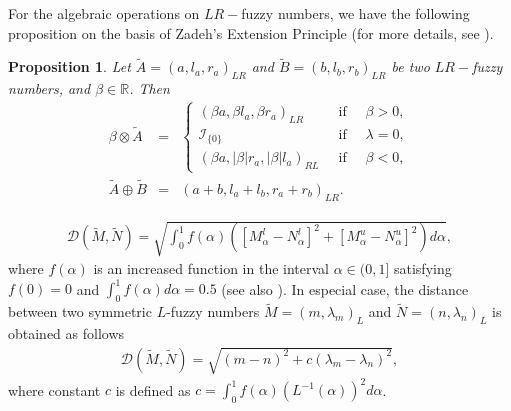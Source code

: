 \documentclass{IJFS}
\newtheorem{proposition}[theorem]{Proposition}
\begin{document}
For the algebraic operations on $LR-$fuzzy numbers, we have the following proposition on the basis of Zadeh's Extension Principle (for more details, see \cite{Kli02}).\\
\begin{proposition}
Let $\widetilde{A} = (a, l_a, r_a)_{LR}$  and  $\widetilde{B} = (b, l_b, r_b)_{LR}$  be two  $LR-$fuzzy numbers,  and  $\beta\in\mathbb{R}$.
Then
\begin{eqnarray*}
    \beta \otimes\widetilde{A} & = & \left\{\begin{array}{lcl}
                (\beta a,\beta l_a,\beta r_a)_{LR} &\  \textrm{\ if\ }\  & \beta>0,\\
                \mathcal{I}_{\{0\}}                                      &\  \textrm{\ if\ }\  & \lambda=0,\\
                (\beta a,|\beta| r_a ,|\beta| l_a)_{RL} &\  \textrm{\ if\ }\  & \beta<0,
                \end{array}
              \right.\\
\widetilde{A}\oplus \widetilde{B} & = & (a + b, l_a+l_b,r_a+r_b)_{LR}.
\end{eqnarray*}
\end{proposition}


\begin{eqnarray*}
    \mathcal{D}(\widetilde{M},\widetilde{N})=\sqrt{\int_0^1 f(\alpha)\left([M_\alpha^l-N_\alpha^l]^2+[M_\alpha^u-N_\alpha^u]^2\right)d\alpha},
\end{eqnarray*}
where $f(\alpha)$ is an increased function in the interval $\alpha\in(0,1]$  satisfying $f(0)=0$ and $\int_0^1f(\alpha)d\alpha=0.5$
(see also  \cite{Are14,Moh04,Xu01}).
In especial case, the distance between two  symmetric $L$-fuzzy numbers $\widetilde{M}=(m,\lambda_m)_{L}$ and $\widetilde{N}=(n,\lambda_n)_{L}$
is obtained as follows
\begin{eqnarray*}
     \mathcal{D}(\widetilde{M},\widetilde{N})=\sqrt{(m-n)^2+c(\lambda_m-\lambda_n)^2},
\end{eqnarray*}
where constant $c$ is defined as $c=\int_0^1 f(\alpha)\left(L^{-1}(\alpha)\right)^2 d\alpha$.
\end{document}
